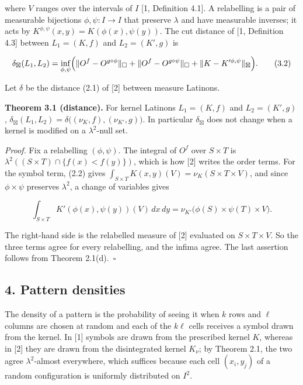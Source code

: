 \documentclass[english,11pt,a4paper]{article}
\begin{document}
where \(V\) ranges over the intervals of \(I\) {[}1, Definition 4.1{]}. A relabelling is a pair of measurable bijections \(\phi,\psi:I\to I\) that preserve \(\lambda\) and have measurable inverses; it acts by \(K^{\phi,\psi}(x,y)=K(\phi(x),\psi(y))\). The cut distance of {[}1, Definition 4.3{]} between \(L_1=(K,f)\) and \(L_2=(K',g)\) is

\nopagebreak[4]
\[\delta_{\boxtimes}(L_1,L_2)=\inf_{\phi,\psi}\Bigl(\|O^f-O^{g\circ\phi}\|_\square+\|O^f-O^{g\circ\psi}\|_\square+\|K-K'^{\phi,\psi}\|_{\boxtimes}\Bigr).\tag{3.2}\]

Let \(\delta\) be the distance (2.1) of {[}2{]} between measure Latinons.

\textbf{Theorem 3.1 (distance).} For kernel Latinons \(L_1=(K,f)\) and \(L_2=(K',g)\), \(\delta_{\boxtimes}(L_1,L_2)=\delta\bigl((\nu_K,f),(\nu_{K'},g)\bigr)\). In particular \(\delta_{\boxtimes}\) does not change when a kernel is modified on a \(\lambda^2\)-null set.

\emph{Proof.} Fix a relabelling \((\phi,\psi)\). The integral of \(O^f\) over \(S\times T\) is \(\lambda^2((S\times T)\cap\{f(x)<f(y)\})\), which is how {[}2{]} writes the order terms. For the symbol term, (2.2) gives \(\int_{S\times T}K(x,y)(V)=\nu_K(S\times T\times V)\), and since \(\phi\times\psi\) preserves \(\lambda^2\), a change of variables gives

\nopagebreak[4]
\[\int_{S\times T}K'(\phi(x),\psi(y))(V)\,dx\,dy=\nu_{K'}\bigl(\phi(S)\times\psi(T)\times V\bigr).\tag{3.3}\]

The right-hand side is the relabelled measure of {[}2{]} evaluated on \(S\times T\times V\). So the three terms agree for every relabelling, and the infima agree. The last assertion follows from Theorem 2.1(d).~\(\square\)

\subsection{4. Pattern densities}\label{pattern-densities}

The density of a pattern is the probability of seeing it when \(k\) rows and \(\ell\) columns are chosen at random and each of the \(k\ell\) cells receives a symbol drawn from the kernel. In {[}1{]} symbols are drawn from the prescribed kernel \(K\), whereas in {[}2{]} they are drawn from the disintegrated kernel \(K_\nu\); by Theorem 2.1, the two agree \(\lambda^2\)-almost everywhere, which suffices because each cell \((x_i,y_j)\) of a random configuration is uniformly distributed on \(I^2\).
\end{document}
